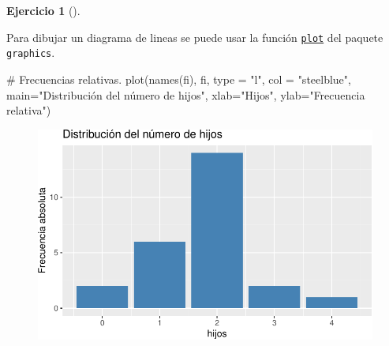 \documentclass[
  a4paper,
]{scrreport}
\newenvironment{Shaded}{\begin{snugshade}}{\end{snugshade}}
\newcommand{\AttributeTok}[1]{\textcolor[rgb]{0.40,0.45,0.13}{#1}}
\newcommand{\CommentTok}[1]{\textcolor[rgb]{0.37,0.37,0.37}{#1}}
\newcommand{\FunctionTok}[1]{\textcolor[rgb]{0.28,0.35,0.67}{#1}}
\newcommand{\NormalTok}[1]{\textcolor[rgb]{0.00,0.23,0.31}{#1}}
\newcommand{\StringTok}[1]{\textcolor[rgb]{0.13,0.47,0.30}{#1}}
\theoremstyle{definition}
\newtheorem{exercise}{Ejercicio}[chapter]
\theoremstyle{remark}
\begin{document}
\begin{exercise}[]
\begin{tcolorbox}[enhanced jigsaw, rightrule=.15mm, toptitle=1mm, colbacktitle=quarto-callout-tip-color!10!white, titlerule=0mm, colback=white, leftrule=.75mm, bottomtitle=1mm, colframe=quarto-callout-tip-color-frame, breakable, title=\textcolor{quarto-callout-tip-color}{\faLightbulb}\hspace{0.5em}{Solución 1}, arc=.35mm, coltitle=black, opacityback=0, bottomrule=.15mm, opacitybacktitle=0.6, left=2mm, toprule=.15mm]

Para dibujar un diagrama de lineas se puede usar la función
\href{https://www.rdocumentation.org/packages/graphics/versions/3.6.2/topics/plot}{\texttt{plot}}
del paquete \texttt{graphics}.

\begin{Shaded}
\begin{Highlighting}[]
\CommentTok{\# Frecuencias relativas.}
\FunctionTok{plot}\NormalTok{(}\FunctionTok{names}\NormalTok{(fi), fi, }\AttributeTok{type =} \StringTok{"l"}\NormalTok{, }\AttributeTok{col =} \StringTok{"steelblue"}\NormalTok{, }\AttributeTok{main=}\StringTok{"Distribución del número de hijos"}\NormalTok{, }\AttributeTok{xlab=}\StringTok{"Hijos"}\NormalTok{, }\AttributeTok{ylab=}\StringTok{"Frecuencia relativa"}\NormalTok{)}
\end{Highlighting}
\end{Shaded}

\begin{figure}[H]

{\centering \includegraphics{./03-frecuencias-graficos_files/figure-pdf/unnamed-chunk-7-1.pdf}

}

\end{figure}


\end{tcolorbox}
\end{exercise}
\end{document}
